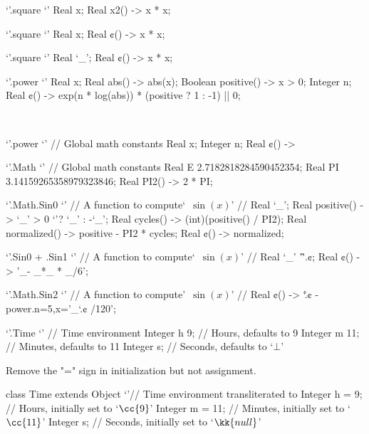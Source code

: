 \begin{reap}
  `'.square {`'
    Real x;
    Real x2() -> x * x;
  }
\end{reap}
\begin{reap}
  `'.square {`'
    Real x;
    Real ¢() -> x * x;
  }
\end{reap}
\begin{reap}
  `'.square {`'
    Real `\_';
    Real ¢() -> x * x;
  }
\end{reap}
\begin{reap}
  `'.power {`'
    Real x;
    Real abs() -> abs(x);
    Boolean positive() -> x > 0;
    Integer n;
    Real ¢() -> exp(n * log(abs)) * (positive ? 1 : -1) || 0;
  }
\end{reap}
\
\begin{reap}
  `'.power {`' // Global math constants
    Real x;
    Integer n;
    Real ¢() ->
  }
\end{reap}
\begin{reap}
  `'.Math {`' // Global math constants
    Real E 2.7182818284590452354;
    Real PI 3.14159265358979323846;
    Real PI2() -> 2 * PI;
  }
\end{reap}
\begin{reap}
  `'.Math.Sin0 {`' // A function to compute`~$\sin(x)$' //
    Real `\_';
    Real positive() -> `\_' > 0 `'? `\_' : -`\_';
    Real cycles() -> (int)(positive() / PI2);
    Real normalized() -> positive - PI2 * cycles;
    Real ¢() -> normalized;
  }
\end{reap}
\begin{reap}
  `'.Sin0 + .Sin1 {`' // A function to compute`~$\sin(x)$' //
    Real `\_' '\^'.¢;
    Real ¢() -> '\_- \_*\_ * \_/6';
  }
\end{reap}
\begin{reap}
  `'.Math.Sin2 {`' // A function to compute'~$\sin(x)$' //
    Real ¢() -> `\^.¢ - power.n=5,x='\_`.¢ /120';
  }
\end{reap}
\begin{reap}
  `'.Time {`' // Time environment
    Integer h 9; // Hours, defaults to 9
    Integer m 11; // Minutes, defaults to 11
    Integer s; // Seconds, defaults to `$⊥$'
  }
\end{reap}
Remove the "=" sign in initialization but not assignment.
\begin{java}
  class Time extends Object {`'// Time environment transliterated to \Java
    Integer h = 9; // Hours, initially set to `$\cc{9}$'
    Integer m = 11; // Minutes, initially set to `$\cc{11}$'
    Integer s; // Seconds, initially set to `$\kk{null}$'
  }
\end{java}

